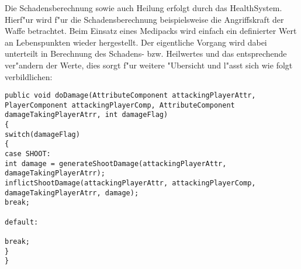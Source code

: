 Die Schadensberechnung sowie auch Heilung erfolgt durch das HealthSystem. Hierf"ur wird f"ur die Schadensberechnung beispielsweise die Angriffskraft der Waffe betrachtet. Beim Einsatz eines Medipacks wird einfach ein definierter Wert an Lebenspunkten wieder hergestellt.
Der eigentliche Vorgang wird dabei unterteilt in Berechnung des Schadens- bzw. Heilwertes und das entsprechende ver"andern der Werte, dies sorgt f"ur weitere "Ubersicht und l"asst sich wie folgt verbildlichen:

\begin{lstlisting}[breaklines = true]
public void doDamage(AttributeComponent attackingPlayerAttr, PlayerComponent attackingPlayerComp, AttributeComponent damageTakingPlayerAtrr, int damageFlag)
{
switch(damageFlag)
{
case SHOOT:
int damage = generateShootDamage(attackingPlayerAttr, damageTakingPlayerAtrr);
inflictShootDamage(attackingPlayerAttr, attackingPlayerComp, damageTakingPlayerAtrr, damage);                    
break;

default:

break;
}
}
\end{lstlisting}